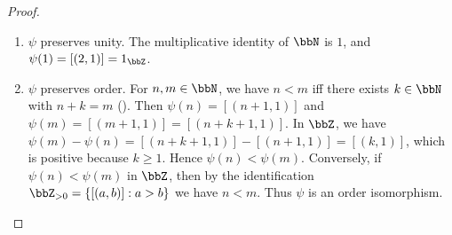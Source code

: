\begin{proof}
\begin{enumerate}
        \item $\psi$ preserves unity. The multiplicative identity of $\bbN$ is $1$, and $\psi(1) = [(2,1)] = 1_\bbZ$.

        \item $\psi$ preserves order. For $n,m \in \bbN$, we have $n < m$ iff there exists $k \in \bbN$ with $n + k = m$ (). Then $\psi(n) = [(n+1,1)]$ and $\psi(m) = [(m+1,1)] = [(n+k+1,1)]$. In $\bbZ$, we have $\psi(m) - \psi(n) = [(n+k+1,1)] - [(n+1,1)] = [(k, 1)]$, which is positive because $k \geq 1$. Hence $\psi(n) < \psi(m)$. Conversely, if $\psi(n) < \psi(m)$ in $\bbZ$, then by the identification $\bbZ_{> 0} = \{[(a,b)] : a > b\}$ we have $n < m$. Thus $\psi$ is an order isomorphism.
    \end{enumerate}
\end{proof}